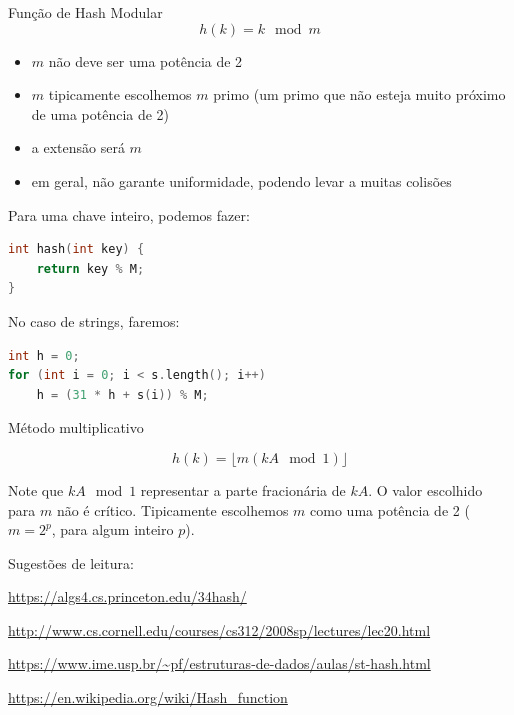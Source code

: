 \begin{frame}
\framebreak

Função de Hash Modular
 $$h(k) = k \mod m$$

\begin{itemize}
\item $m$ não deve ser uma potência de 2
\item $m$ tipicamente escolhemos $m$ primo
  (um primo que não esteja muito próximo de uma potência de 2)
\item a extensão será $m$
\item em geral, não garante uniformidade, podendo levar a muitas colisões
\end{itemize}


\framebreak

Para uma chave inteiro, podemos fazer:
\begin{lstlisting}[language=C, label=lst-hash-mod, caption={Função de Hash Modular.}, postbreak=\mbox{$\hookrightarrow$\space}, basicstyle=\fontsize{8}{10}\selectfont\ttfamily]
int hash(int key) {
    return key % M;
}
\end{lstlisting}


No caso de strings, faremos:
\begin{lstlisting}[language=C, label=lst-hash-mod, caption={Função de Hash Modular.}, postbreak=\mbox{$\hookrightarrow$\space}, basicstyle=\fontsize{8}{10}\selectfont\ttfamily]
int h = 0;
for (int i = 0; i < s.length(); i++)
    h = (31 * h + s(i)) % M;
\end{lstlisting}

\framebreak

Método multiplicativo

  $$h(k) = \lfloor m (kA \mod 1) \rfloor $$

Note que $kA \mod 1$ representar a parte fracionária de $kA$.
O valor escolhido para $m$ não é crítico.
Tipicamente escolhemos $m$ como uma potência de 2 ($m=2^p$, para algum inteiro $p$).


\framebreak
Sugestões de leitura:
\vspace{2ex}

\vspace{2ex}

\url{https://algs4.cs.princeton.edu/34hash/}
\vspace{2ex}

\url{http://www.cs.cornell.edu/courses/cs312/2008sp/lectures/lec20.html}
\vspace{2ex}

\url{https://www.ime.usp.br/~pf/estruturas-de-dados/aulas/st-hash.html}
\vspace{2ex}

\url{https://en.wikipedia.org/wiki/Hash_function}




\end{frame}
